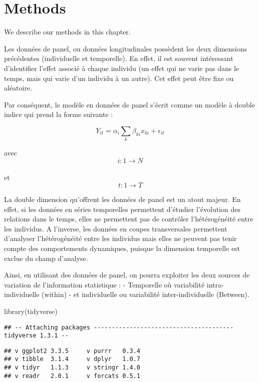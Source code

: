 \documentclass[
]{book}
\newenvironment{Shaded}{\begin{snugshade}}{\end{snugshade}}
\newcommand{\FunctionTok}[1]{\textcolor[rgb]{0.00,0.00,0.00}{#1}}
\newcommand{\NormalTok}[1]{#1}
\begin{document}
\hypertarget{methods}{%
\chapter{Methods}\label{methods}}

We describe our methods in this chapter.

Les données de panel, ou données longitudinales possèdent les deux dimensions précédentes (individuelle et temporelle). En effet, il est souvent intéressant d'identifier l'effet associé à chaque individu (un effet qui ne varie pas dans le temps, mais qui varie d'un individu à un autre). Cet effet peut être fixe ou aléatoire.

Par conséquent, le modèle en données de panel s'écrit comme un modèle à double indice qui prend la forme suivante :

\[ Y_{it}= \alpha_i\sum_{k}\beta_{ki}x_{ki}+ \epsilon_{it} \]

avec
\[ i:1 \rightarrow N \]\\
et
\[ t:1 \rightarrow T \]

La double dimension qu'offrent les données de panel est un atout majeur. En effet, si les données en séries temporelles permettent d'étudier l'évolution des relations dans le temps, elles ne permettent pas de contrôler l'hétérogénéité entre les individus. A l'inverse, les données en coupes transversales permettent d'analyser l'hétérogénéité entre les individus mais elles ne peuvent pas tenir compte des comportements dynamiques, puisque la dimension temporelle est exclue du champ d'analyse.

Ainsi, en utilisant des données de panel, on pourra exploiter les deux sources de variation de l'information statistique :
- Temporelle où variabilité intra-individuelle (within)
- et individuelle ou variabilité inter-individuelle (Between).

\begin{Shaded}
\begin{Highlighting}[]
\FunctionTok{library}\NormalTok{(tidyverse)}
\end{Highlighting}
\end{Shaded}

\begin{verbatim}
## -- Attaching packages --------------------------------------- tidyverse 1.3.1 --
\end{verbatim}

\begin{verbatim}
## v ggplot2 3.3.5     v purrr   0.3.4
## v tibble  3.1.4     v dplyr   1.0.7
## v tidyr   1.1.3     v stringr 1.4.0
## v readr   2.0.1     v forcats 0.5.1
\end{verbatim}
\end{document}
